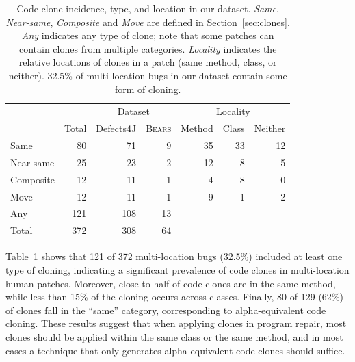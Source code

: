 \documentclass[10pt, conference]{IEEEtran}
\newcommand\bears{\textsc{Bears}\xspace}
\begin{document}
\begin{table}
{\begin{center}
\begin{tabular} {lrrrrrr}
\toprule
&&\multicolumn{2}{c}{Dataset} &\multicolumn{3}{c}{Locality}\\
& Total & Defects4J & \bears & Method & Class & Neither\\
\midrule
Same      &  80 &  71 & 9 & 35 & 33 & 12 \\
Near-same   &  25 &  23 & 2 & 12 &  8 &  5 \\
Composite &  12 &  11 & 1 &  4 &  8 &  0 \\
Move      &  12 &  11 & 1 &  9 &  1 &  2 \\
\midrule
Any       & 121 & 108 & 13\\
Total     & 372 & 308 & 64\\
\bottomrule
\end{tabular}
\end{center}
}
\caption{\small Code clone incidence, type, and location in our dataset. \emph{Same}, \emph{Near-same},
  \emph{Composite} and \emph{Move} are defined in Section~\ref{sec:clones}.
  \emph{Any} indicates any type of clone; note that some patches can
  contain clones from multiple categories. \emph{Locality} indicates
  the relative locations of clones in a patch (same method, class, or neither). 32.5\% of multi-location bugs
  in our dataset contain some form of cloning. }
\label{tab:clones}
\end{table}

Table~\ref{tab:clones} shows that 121 of 372 multi-location bugs
(32.5\%) included at least one type of cloning,
indicating a significant prevalence of code clones in multi-location human
patches.
%
Moreover, close to half of code clones are in the same method, while less than
15\% of the cloning occurs across classes. Finally, 80 of 129 (62\%) of clones
fall in the ``same'' category, corresponding to alpha-equivalent code cloning.
These results suggest that when applying clones in program repair, 
most clones should be applied within the same class or the same method, and
in most cases a technique that only generates alpha-equivalent code clones should suffice.
\end{document}
